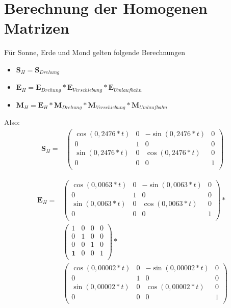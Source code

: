 \documentclass[a4paper,11pt,DIV11]{scrartcl}
\begin{document}
\section{Berechnung der Homogenen Matrizen}
Für Sonne, Erde und Mond gelten folgende Berechnungen
\begin{itemize}
\item $\bm{S}_H = \bm{S}_{Drehung}$
\item $\bm{E}_H = \bm{E}_{Drehung} * \bm{E}_{Verschiebung} * \bm{E}_{Umlaufbahn}$
\item $\bm{M}_H = \bm{E}_{H} * \bm{M}_{Drehung} * \bm{M}_{Verschiebung} * \bm{M}_{Umlaufbahn}$
\end{itemize}
Also: \\
\begin{align}
\bm{S}_{H} = &
\begin{pmatrix}
\cos(0,2476 * t) & 0 &-\sin(0,2476 * t) & 0 \\
0 & 1 & 0 & 0 \\
\sin(0,2476 * t) & 0 & \cos(0,2476 * t) & 0 \\
0 & 0 & 0 & 1 \\
\end{pmatrix}
\end{align}

\begin{align}
\bm{E}_{H} = &
\begin{pmatrix}
\cos(0,0063 * t) & 0 &-\sin(0,0063 * t) & 0 \\
0 & 1 & 0 & 0 \\
\sin(0,0063 * t) & 0 & \cos(0,0063 * t) & 0 \\
0 & 0 & 0 & 1 \\
\end{pmatrix} * 
\\ &
\begin{pmatrix}
1 & 0 & 0 & 0 \\
0 & 1 & 0 & 0 \\
0 & 0 & 1 & 0 \\
\textbf{1} & 0 & 0 & 1 \\
\end{pmatrix} * 
\\ &
\begin{pmatrix}
\cos(0,00002 * t) & 0 & -\sin(0,00002 * t) & 0 \\
0 & 1 & 0 & 0 \\
\sin(0,00002 * t) & 0 & \cos(0,00002 * t) & 0 \\
0 & 0 & 0 & 1 \\
\end{pmatrix}
\end{align}
\end{document}
